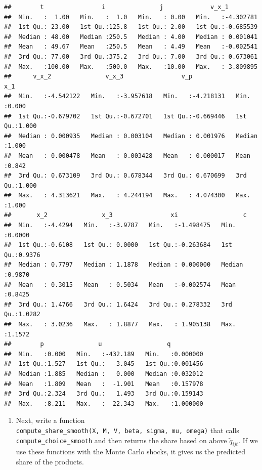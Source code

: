 \documentclass[
]{book}
\providecommand{\tightlist}{%
  \setlength{\itemsep}{0pt}\setlength{\parskip}{0pt}}
\begin{document}
\begin{verbatim}
##        t                i               j             v_x_1          
##  Min.   :  1.00   Min.   :  1.0   Min.   : 0.00   Min.   :-4.302781  
##  1st Qu.: 23.00   1st Qu.:125.8   1st Qu.: 2.00   1st Qu.:-0.685539  
##  Median : 48.00   Median :250.5   Median : 4.00   Median : 0.001041  
##  Mean   : 49.67   Mean   :250.5   Mean   : 4.49   Mean   :-0.002541  
##  3rd Qu.: 77.00   3rd Qu.:375.2   3rd Qu.: 7.00   3rd Qu.: 0.673061  
##  Max.   :100.00   Max.   :500.0   Max.   :10.00   Max.   : 3.809895  
##      v_x_2               v_x_3                v_p                 x_1       
##  Min.   :-4.542122   Min.   :-3.957618   Min.   :-4.218131   Min.   :0.000  
##  1st Qu.:-0.679702   1st Qu.:-0.672701   1st Qu.:-0.669446   1st Qu.:1.000  
##  Median : 0.000935   Median : 0.003104   Median : 0.001976   Median :1.000  
##  Mean   : 0.000478   Mean   : 0.003428   Mean   : 0.000017   Mean   :0.842  
##  3rd Qu.: 0.673109   3rd Qu.: 0.678344   3rd Qu.: 0.670699   3rd Qu.:1.000  
##  Max.   : 4.313621   Max.   : 4.244194   Max.   : 4.074300   Max.   :1.000  
##       x_2               x_3                xi                  c         
##  Min.   :-4.4294   Min.   :-3.9787   Min.   :-1.498475   Min.   :0.0000  
##  1st Qu.:-0.6108   1st Qu.: 0.0000   1st Qu.:-0.263684   1st Qu.:0.9376  
##  Median : 0.7797   Median : 1.1878   Median : 0.000000   Median :0.9870  
##  Mean   : 0.3015   Mean   : 0.5034   Mean   :-0.002574   Mean   :0.8425  
##  3rd Qu.: 1.4766   3rd Qu.: 1.6424   3rd Qu.: 0.278332   3rd Qu.:1.0282  
##  Max.   : 3.0236   Max.   : 1.8877   Max.   : 1.905138   Max.   :1.1572  
##        p               u                  q           
##  Min.   :0.000   Min.   :-432.189   Min.   :0.000000  
##  1st Qu.:1.527   1st Qu.:  -3.045   1st Qu.:0.001456  
##  Median :1.885   Median :   0.000   Median :0.032012  
##  Mean   :1.809   Mean   :  -1.901   Mean   :0.157978  
##  3rd Qu.:2.324   3rd Qu.:   1.493   3rd Qu.:0.159143  
##  Max.   :8.211   Max.   :  22.343   Max.   :1.000000
\end{verbatim}

\begin{enumerate}
\def\labelenumi{\arabic{enumi}.}
\setcounter{enumi}{8}
\tightlist
\item
  Next, write a function \texttt{compute\_share\_smooth(X,\ M,\ V,\ beta,\ sigma,\ mu,\ omega)} that calls \texttt{compute\_choice\_smooth} and then returns the share based on above \(\tilde{q}_{ijt}\). If we use these functions with the Monte Carlo shocks, it gives us the predicted share of the products.
\end{enumerate}
\end{document}
